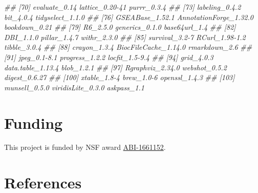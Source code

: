 \documentclass[14pt,]{article}
\newcommand{\hlcom}[1]{\textcolor[rgb]{0.502,0.502,0.502}{\textit{#1}}}%
\newenvironment{Shaded}{\begin{myshaded}}{\end{myshaded}}
\newcommand{\DocumentationTok}[1]{\hlcom{#1}}
\begin{document}
\begin{Shaded}
\begin{Highlighting}[]
\DocumentationTok{\#\#  [70] evaluate\_0.14            lattice\_0.20{-}41          purrr\_0.3.4             }
\DocumentationTok{\#\#  [73] labeling\_0.4.2           bit\_4.0.4                tidyselect\_1.1.0        }
\DocumentationTok{\#\#  [76] GSEABase\_1.52.1          AnnotationForge\_1.32.0   bookdown\_0.21           }
\DocumentationTok{\#\#  [79] R6\_2.5.0                 generics\_0.1.0           base64url\_1.4           }
\DocumentationTok{\#\#  [82] DBI\_1.1.0                pillar\_1.4.7             withr\_2.3.0             }
\DocumentationTok{\#\#  [85] survival\_3.2{-}7           RCurl\_1.98{-}1.2           tibble\_3.0.4            }
\DocumentationTok{\#\#  [88] crayon\_1.3.4             BiocFileCache\_1.14.0     rmarkdown\_2.6           }
\DocumentationTok{\#\#  [91] jpeg\_0.1{-}8.1             progress\_1.2.2           locfit\_1.5{-}9.4          }
\DocumentationTok{\#\#  [94] grid\_4.0.3               data.table\_1.13.4        blob\_1.2.1              }
\DocumentationTok{\#\#  [97] Rgraphviz\_2.34.0         webshot\_0.5.2            digest\_0.6.27           }
\DocumentationTok{\#\# [100] xtable\_1.8{-}4             brew\_1.0{-}6               openssl\_1.4.3           }
\DocumentationTok{\#\# [103] munsell\_0.5.0            viridisLite\_0.3.0        askpass\_1.1}
\end{Highlighting}
\end{Shaded}

\hypertarget{funding}{%
\section{Funding}\label{funding}}

This project is funded by NSF award \href{https://www.nsf.gov/awardsearch/showAward?AWD_ID=1661152}{ABI-1661152}.

\hypertarget{references}{%
\section*{References}\label{references}}
\end{document}
